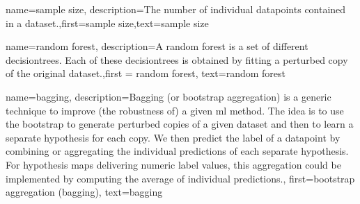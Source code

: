 	
{name=sample size,
	description={The number of individual \gls{datapoint}s 
		contained in a \gls{dataset}.},first={sample size},text={sample size}
}



{name={random forest},
  description={A random forest is a set of different \gls{decisiontree}s. 
		Each of these \gls{decisiontree}s is obtained by fitting a perturbed copy of 
		the original \gls{dataset}.},first = {random forest}, text={random forest}
}

{name={bagging},
 description={Bagging (or bootstrap aggregation) 
		is a generic technique to improve (the robustness of) a given \gls{ml} method. 
		The idea is to use the \gls{bootstrap} to generate perturbed copies of a given \gls{dataset} 
		and then to learn a separate \gls{hypothesis} for each copy. We then predict the 
		\gls{label} of a \gls{datapoint} by combining or aggregating the individual \gls{prediction}s 
		of each separate \gls{hypothesis}. For \gls{hypothesis} maps delivering numeric \gls{label} 
		values, this aggregation could be implemented by computing the average of individual 
		\gls{prediction}s.},
		first={bootstrap aggregation (bagging)},
		text={bagging}}

